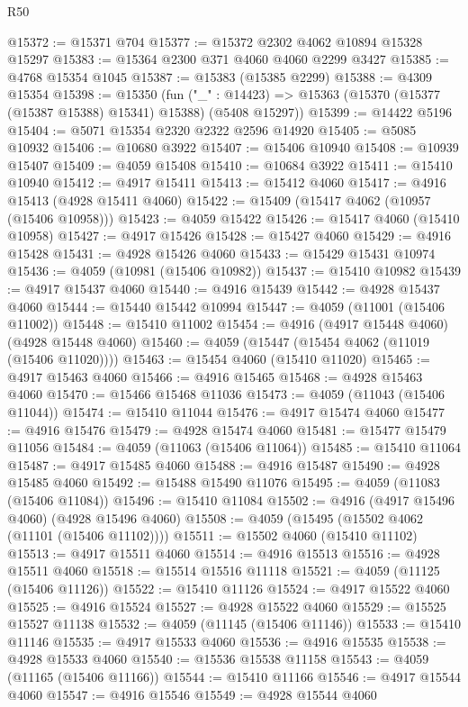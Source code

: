 \begin{lexlean}{R50}
\begin{coremodule}
@15372 := @15371 @704
@15377 := @15372 @2302 @4062 @10894 @15328 @15297
@15383 := @15364 @2300 @371 @4060 @4060 @2299 @3427
@15385 := @4768 @15354 @1045
@15387 := @15383 (@15385 @2299)
@15388 := @4309 @15354
@15398 := @15350
    (fun ("_" : @14423) => @15363 (@15370 (@15377 (@15387 @15388) @15341) @15388) (@5408 @15297))
@15399 := @14422 @5196
@15404 := @5071 @15354 @2320 @2322 @2596 @14920
@15405 := @5085 @10932
@15406 := @10680 @3922
@15407 := @15406 @10940
@15408 := @10939 @15407
@15409 := @4059 @15408
@15410 := @10684 @3922
@15411 := @15410 @10940
@15412 := @4917 @15411
@15413 := @15412 @4060
@15417 := @4916 @15413 (@4928 @15411 @4060)
@15422 := @15409 (@15417 @4062 (@10957 (@15406 @10958)))
@15423 := @4059 @15422
@15426 := @15417 @4060 (@15410 @10958)
@15427 := @4917 @15426
@15428 := @15427 @4060
@15429 := @4916 @15428
@15431 := @4928 @15426 @4060
@15433 := @15429 @15431 @10974
@15436 := @4059 (@10981 (@15406 @10982))
@15437 := @15410 @10982
@15439 := @4917 @15437 @4060
@15440 := @4916 @15439
@15442 := @4928 @15437 @4060
@15444 := @15440 @15442 @10994
@15447 := @4059 (@11001 (@15406 @11002))
@15448 := @15410 @11002
@15454 := @4916 (@4917 @15448 @4060) (@4928 @15448 @4060)
@15460 := @4059 (@15447 (@15454 @4062 (@11019 (@15406 @11020))))
@15463 := @15454 @4060 (@15410 @11020)
@15465 := @4917 @15463 @4060
@15466 := @4916 @15465
@15468 := @4928 @15463 @4060
@15470 := @15466 @15468 @11036
@15473 := @4059 (@11043 (@15406 @11044))
@15474 := @15410 @11044
@15476 := @4917 @15474 @4060
@15477 := @4916 @15476
@15479 := @4928 @15474 @4060
@15481 := @15477 @15479 @11056
@15484 := @4059 (@11063 (@15406 @11064))
@15485 := @15410 @11064
@15487 := @4917 @15485 @4060
@15488 := @4916 @15487
@15490 := @4928 @15485 @4060
@15492 := @15488 @15490 @11076
@15495 := @4059 (@11083 (@15406 @11084))
@15496 := @15410 @11084
@15502 := @4916 (@4917 @15496 @4060) (@4928 @15496 @4060)
@15508 := @4059 (@15495 (@15502 @4062 (@11101 (@15406 @11102))))
@15511 := @15502 @4060 (@15410 @11102)
@15513 := @4917 @15511 @4060
@15514 := @4916 @15513
@15516 := @4928 @15511 @4060
@15518 := @15514 @15516 @11118
@15521 := @4059 (@11125 (@15406 @11126))
@15522 := @15410 @11126
@15524 := @4917 @15522 @4060
@15525 := @4916 @15524
@15527 := @4928 @15522 @4060
@15529 := @15525 @15527 @11138
@15532 := @4059 (@11145 (@15406 @11146))
@15533 := @15410 @11146
@15535 := @4917 @15533 @4060
@15536 := @4916 @15535
@15538 := @4928 @15533 @4060
@15540 := @15536 @15538 @11158
@15543 := @4059 (@11165 (@15406 @11166))
@15544 := @15410 @11166
@15546 := @4917 @15544 @4060
@15547 := @4916 @15546
@15549 := @4928 @15544 @4060

\end{coremodule}
\end{lexlean}
